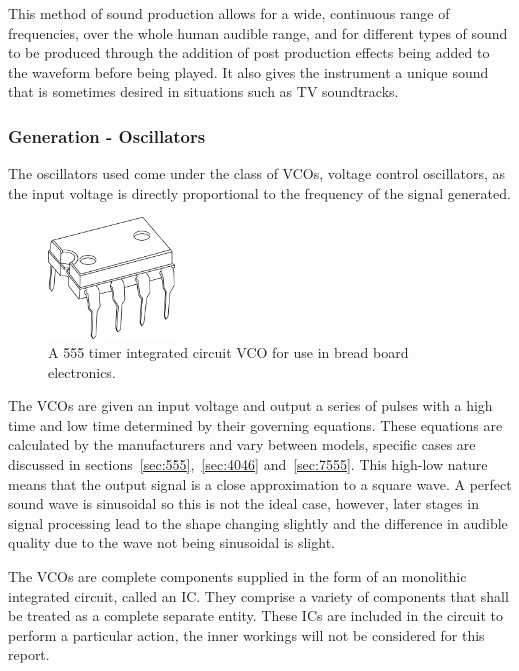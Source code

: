 This method of sound production allows for a wide, continuous range of frequencies, over the whole human audible range, and for different types of sound to be produced through the addition of post production effects being added to the waveform before being played. It also gives the instrument a unique sound that is sometimes desired in situations such as TV soundtracks.

\subsubsection{Generation - Oscillators}

The oscillators used come under the class of VCOs, voltage control oscillators, as the input voltage is directly proportional to the frequency of the signal generated. 

\begin{figure}
  \begin{center}
    \includegraphics[width=0.3\textwidth]{report_img/ic}
  \end{center}
  \caption{A 555 timer integrated circuit VCO for use in bread board electronics.}
  \label{fig:timer ic}
\end{figure}

The VCOs are given an input voltage and output a series of pulses with a high time and low time determined by their governing equations. These equations are calculated by the manufacturers and vary between models, specific cases are discussed in sections~\ref{sec:555},~\ref{sec:4046} and~\ref{sec:7555}. This high-low nature means that the output signal is a close approximation to a square wave. A perfect sound wave is sinusoidal so this is not the ideal case, however, later stages in signal processing lead to the shape changing slightly and the difference in audible quality due to the wave not being sinusoidal is slight.

The VCOs are complete components supplied in the form of an monolithic integrated circuit, called an IC. They comprise a variety of components that shall be treated as a complete separate entity. These ICs are included in the circuit to perform a particular action, the inner workings will not be considered for this report.

